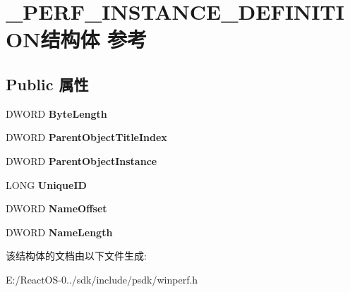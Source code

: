 \hypertarget{struct___p_e_r_f___i_n_s_t_a_n_c_e___d_e_f_i_n_i_t_i_o_n}{}\section{\+\_\+\+P\+E\+R\+F\+\_\+\+I\+N\+S\+T\+A\+N\+C\+E\+\_\+\+D\+E\+F\+I\+N\+I\+T\+I\+O\+N结构体 参考}
\label{struct___p_e_r_f___i_n_s_t_a_n_c_e___d_e_f_i_n_i_t_i_o_n}
\subsection*{Public 属性}
\begin{DoxyCompactItemize}
\item 
\mbox{\label{struct___p_e_r_f___i_n_s_t_a_n_c_e___d_e_f_i_n_i_t_i_o_n_a48d17ba566add80ff6769378e8150f01}} 
D\+W\+O\+RD {\bfseries Byte\+Length}
\item 
\mbox{\label{struct___p_e_r_f___i_n_s_t_a_n_c_e___d_e_f_i_n_i_t_i_o_n_a4e927f08d857f22eb23a25f694874fc8}} 
D\+W\+O\+RD {\bfseries Parent\+Object\+Title\+Index}
\item 
\mbox{\label{struct___p_e_r_f___i_n_s_t_a_n_c_e___d_e_f_i_n_i_t_i_o_n_a8fbf33a6d9c0b08abea698697195296c}} 
D\+W\+O\+RD {\bfseries Parent\+Object\+Instance}
\item 
\mbox{\label{struct___p_e_r_f___i_n_s_t_a_n_c_e___d_e_f_i_n_i_t_i_o_n_ae56eea1ac1f63d0dba12a1cf0418c3cc}} 
L\+O\+NG {\bfseries Unique\+ID}
\item 
\mbox{\label{struct___p_e_r_f___i_n_s_t_a_n_c_e___d_e_f_i_n_i_t_i_o_n_a3c6e3521c9c9b61e3f5ebcf08c5ac75e}} 
D\+W\+O\+RD {\bfseries Name\+Offset}
\item 
\mbox{\label{struct___p_e_r_f___i_n_s_t_a_n_c_e___d_e_f_i_n_i_t_i_o_n_addc72df6d0838750589015609e2eb7d1}} 
D\+W\+O\+RD {\bfseries Name\+Length}
\end{DoxyCompactItemize}


该结构体的文档由以下文件生成\+:\begin{DoxyCompactItemize}
\item 
E\+:/\+React\+O\+S-\/0../sdk/include/psdk/winperf.\+h\end{DoxyCompactItemize}
